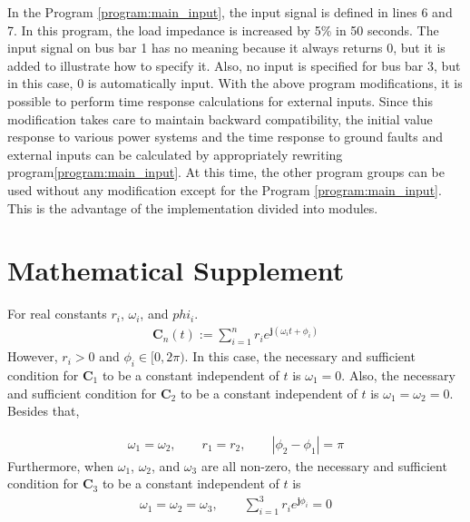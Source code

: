 \documentclass[graybox, envcountchap]{svmult}
\begin{document}
\begin{example}
In the Program \nobreak\ref{program:main_input}, the input signal is defined in lines 6 and 7. In this program, the load impedance is increased by 5\% in 50 seconds.
The input signal on bus bar 1 has no meaning because it always returns 0, but it is added to illustrate how to specify it.
Also, no input is specified for bus bar 3, but in this case, 0 is automatically input.
With the above program modifications, it is possible to perform time response calculations for external inputs.
Since this modification takes care to maintain backward compatibility, the initial value response to various power systems and the time response to ground faults and external inputs can be calculated by appropriately rewriting program\nobreak\ref{program:main_input}.
At this time, the other program groups can be used without any modification except for the Program \nobreak\ref{program:main_input}.
This is the advantage of the implementation divided into modules.
\end{example}


\section*{Mathematical Supplement}
\begin{lemma}\label{lem:sumc}
For real constants $r_i$, $\omega_i$, and $phi_i$.
\begin{align*}
\bm{C}_n(t) := 
\sum_{i=1}^n r_i e^{ \bm{j} (\omega_i t + \phi_i)}
\end{align*}
However, $r_i>0$ and $\phi_i \in [0,2\pi)$.
In this case, the necessary and sufficient condition for $\bm{C}_1$ to be a constant independent of $t$ is $\omega_1=0$.
Also, the necessary and sufficient condition for $\bm{C}_2$ to be a constant independent of $t$ is $\omega_1=\omega_2=0$.
Besides that,

\begin{align*}
\omega_1=\omega_2
,\qquad
r_1=r_2
,\qquad
|\phi_2-\phi_1| = \pi
\end{align*}
Furthermore, when $\omega_1$, $\omega_2$, and $\omega_3$ are all non-zero, the necessary and sufficient condition for $\bm{C}_3$ to be a constant independent of $t$ is
\begin{align*}
\omega_1=\omega_2=\omega_3
,\qquad
\sum_{i=1}^3 r_i e^{\bm{j}\phi_i}=0
\end{align*}
\end{lemma}
\end{document}
